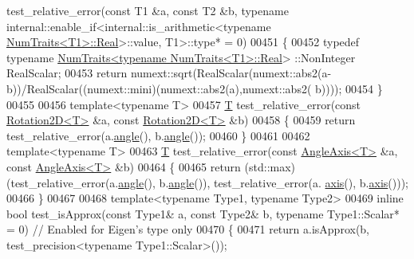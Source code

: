 \begin{DoxyCode}
      test\_relative\_error(\textcolor{keyword}{const} T1 &a, \textcolor{keyword}{const} T2 &b, \textcolor{keyword}{typename} internal::enable\_if<internal::is\_arithmetic<\textcolor{keyword}{typename} 
      \hyperlink{group___core___module_struct_eigen_1_1_num_traits}{NumTraits<T1>::Real}>::value, T1>::type* = 0)
00451 \{
00452   \textcolor{keyword}{typedef} \textcolor{keyword}{typename} \hyperlink{group___core___module_struct_eigen_1_1_num_traits}{NumTraits<typename NumTraits<T1>::Real}>
      ::NonInteger RealScalar;
00453   \textcolor{keywordflow}{return} numext::sqrt(RealScalar(numext::abs2(a-b))/RealScalar((numext::mini)(numext::abs2(a),numext::abs2(
      b))));
00454 \}
00455 
00456 \textcolor{keyword}{template}<\textcolor{keyword}{typename} T>
00457 \hyperlink{group___sparse_core___module}{T} test\_relative\_error(\textcolor{keyword}{const} \hyperlink{group___geometry___module_class_eigen_1_1_rotation2_d}{Rotation2D<T>} &a, \textcolor{keyword}{const} \hyperlink{group___geometry___module_class_eigen_1_1_rotation2_d}{Rotation2D<T>} &b)
00458 \{
00459   \textcolor{keywordflow}{return} test\_relative\_error(a.\hyperlink{group___geometry___module_af34ab8da6bfe010ca66c8acafa239a6e}{angle}(), b.\hyperlink{group___geometry___module_af34ab8da6bfe010ca66c8acafa239a6e}{angle}());
00460 \}
00461 
00462 \textcolor{keyword}{template}<\textcolor{keyword}{typename} T>
00463 \hyperlink{group___sparse_core___module}{T} test\_relative\_error(\textcolor{keyword}{const} \hyperlink{group___geometry___module_class_eigen_1_1_angle_axis}{AngleAxis<T>} &a, \textcolor{keyword}{const} \hyperlink{group___geometry___module_class_eigen_1_1_angle_axis}{AngleAxis<T>} &b)
00464 \{
00465   \textcolor{keywordflow}{return} (std::max)(test\_relative\_error(a.\hyperlink{group___geometry___module_a83d3c08a73c111550b7e480d3ed043d4}{angle}(), b.\hyperlink{group___geometry___module_a83d3c08a73c111550b7e480d3ed043d4}{angle}()), test\_relative\_error(a.
      \hyperlink{group___geometry___module_ae40cc36c8dcd9977e1540d91a80696bb}{axis}(), b.\hyperlink{group___geometry___module_ae40cc36c8dcd9977e1540d91a80696bb}{axis}()));
00466 \}
00467 
00468 \textcolor{keyword}{template}<\textcolor{keyword}{typename} Type1, \textcolor{keyword}{typename} Type2>
00469 \textcolor{keyword}{inline} \textcolor{keywordtype}{bool} test\_isApprox(\textcolor{keyword}{const} Type1& a, \textcolor{keyword}{const} Type2& b, \textcolor{keyword}{typename} Type1::Scalar* = 0) \textcolor{comment}{// Enabled for
       Eigen's type only}
00470 \{
00471   \textcolor{keywordflow}{return} a.isApprox(b, test\_precision<typename Type1::Scalar>());

\end{DoxyCode}
